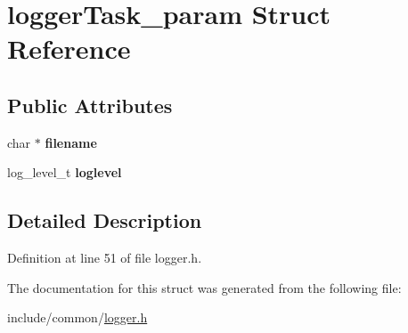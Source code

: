 \hypertarget{structloggerTask__param}{}\section{logger\+Task\+\_\+param Struct Reference}
\label{structloggerTask__param}
\subsection*{Public Attributes}
\begin{DoxyCompactItemize}
\item 
\mbox{\label{structloggerTask__param_aea04d7d9c5f62c2986470ba7e8028a89}} 
char $\ast$ {\bfseries filename}
\item 
\mbox{\label{structloggerTask__param_a00b4463ec089cbba3cfb67bfa224b777}} 
log\+\_\+level\+\_\+t {\bfseries loglevel}
\end{DoxyCompactItemize}


\subsection{Detailed Description}


Definition at line 51 of file logger.\+h.



The documentation for this struct was generated from the following file\+:\begin{DoxyCompactItemize}
\item 
include/common/\hyperlink{logger_8h}{logger.\+h}\end{DoxyCompactItemize}
